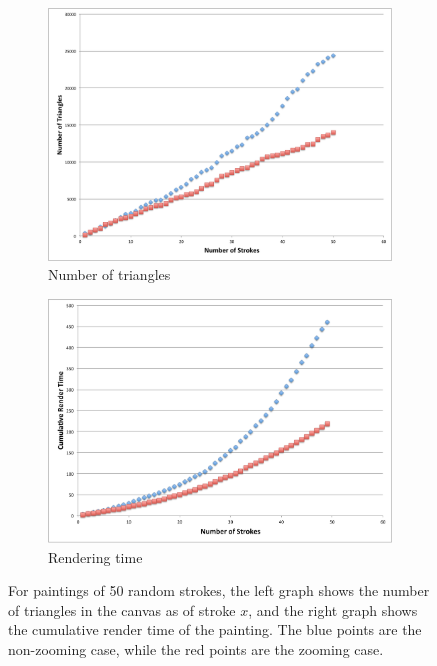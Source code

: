 \documentclass[review]{acmsiggraph}
\begin{document}
\begin{figure}
  \centering
  \begin{subfigure}[b]{0.5\columnwidth}
    \centering
    \includegraphics[width=\columnwidth]{graphs/numtriangles}
    \caption{Number of triangles}
    \label{fig:numtriangles}
  \end{subfigure}%
  \begin{subfigure}[b]{0.5\columnwidth}
    \centering
    \includegraphics[width=\columnwidth]{graphs/cumulativetime}
    \caption{Rendering time}
    \label{fig:timing}
  \end{subfigure}%
  \caption{For paintings of 50 random strokes, the left graph shows the number of triangles in the canvas as of stroke $x$, and the right graph shows the cumulative render time of the painting. The blue points are the non-zooming case, while the red points are the zooming case.}
\end{figure}
\end{document}
